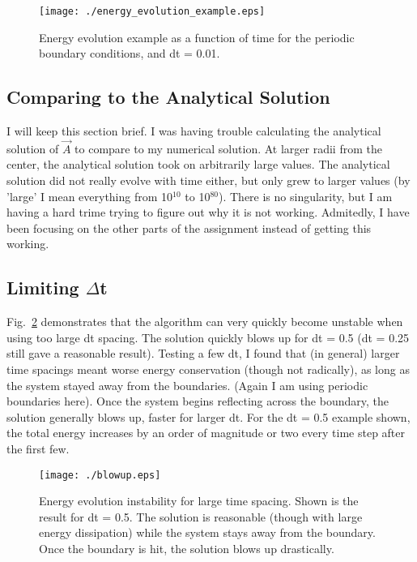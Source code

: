 \documentclass[a4paper]{article}
\begin{document}
\begin{figure}[h!]
	\centering
	\texttt{[image: ./energy\_evolution\_example.eps]}
	\caption{Energy evolution example as a function of time for the periodic
	         boundary conditions, and dt = 0.01.}
	\label{fig:energy_evolution}
\end{figure}

\subsection{Comparing to the Analytical Solution}
I will keep this section brief. I was having trouble calculating the analytical
solution of $\vec{A}$ to compare to my numerical solution. At larger radii
from the center, the analytical solution took on arbitrarily large values. The 
analytical solution did not really evolve with time either, but only grew to
larger values (by 'large' I mean everything from 10$^{10}$ to 10$^{80}$). There
is no singularity, but I am having a hard trime trying to figure out why
it is not working. Admitedly, I have been focusing on the other parts of the 
assignment instead of getting this working.

\subsection{Limiting $\Delta$t}
Fig.~\ref{fig:blowup} demonstrates that the algorithm can very quickly
become unstable when using too large dt spacing. The solution quickly blows
up for dt = 0.5 (dt = 0.25 still gave a reasonable result). Testing a few dt,
I found that (in general) larger time spacings meant worse energy conservation
(though not radically), as long as the system stayed away from the boundaries.
(Again I am using periodic boundaries here). Once the system begins reflecting
across the boundary, the solution generally blows up, faster for larger dt.
For the dt = 0.5 example shown, the total energy increases by an order of 
magnitude or two every time step after the first few. 

\begin{figure}[h!]
	\centering
	\texttt{[image: ./blowup.eps]}
	\caption{Energy evolution instability for large time spacing. Shown is the
	         result for dt = 0.5. The solution is reasonable (though with large
	         energy dissipation) while the system stays away from the boundary.
	         Once the boundary is hit, the solution blows up drastically.}
  	\label{fig:blowup}
\end{figure}
\end{document}

